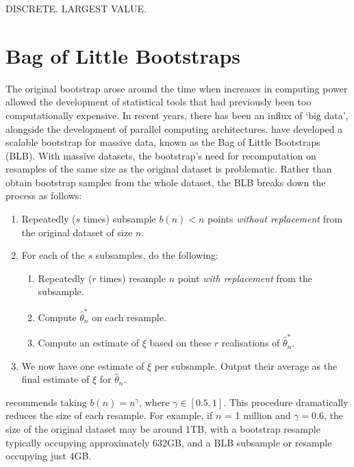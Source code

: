 \documentclass{article}\usepackage[]{graphicx}\usepackage[]{color}
\begin{document}
DISCRETE. LARGEST VALUE.



\section{Bag of Little Bootstraps}
The original bootstrap arose around the time when increases in computing power allowed the development of statistical tools that had previously been too computationally expensive. In recent years, there has been an influx of `big data', alongside the development of parallel computing architectures. \textcite{Kleiner2014} have developed a scalable bootstrap for massive data, known as the Bag of Little Bootstraps (BLB). With massive datasets, the bootstrap's need for recomputation on resamples of the same size as the original dataset is problematic. Rather than obtain bootstrap samples from the whole dataset, the BLB breaks down the process as follows:

\begin{enumerate}
\item Repeatedly ($s$ times) subsample $b(n) < n$ points \emph{without replacement} from the original dataset of size $n$.
\item For each of the $s$ subsamples, do the following:
\begin{enumerate}
\item Repeatedly ($r$ times) resample $n$ point \emph{with replacement} from the subsample.
\item Compute $\hat\theta_n^*$ on each resample.
\item Compute an estimate of $\xi$ based on these $r$ realisations of $\hat\theta_n^*$.
\end{enumerate}
\item We now have one estimate of $\xi$ per subsample. Output their average as the final estimate of $\xi$ for $\hat\theta_n$.
\end{enumerate}


\textcite{Kleiner2014} recommends taking $b(n) = n^{\gamma}$, where $\gamma \in [0.5,1]$. This procedure dramatically reduces the size of each resample. For example, if $n$ = 1 million and $\gamma=0.6$, the size of the original dataset may be around 1TB, with a bootstrap resample typically occupying approximately 632GB, and a BLB subsample or resample occupying just 4GB.
\end{document}
